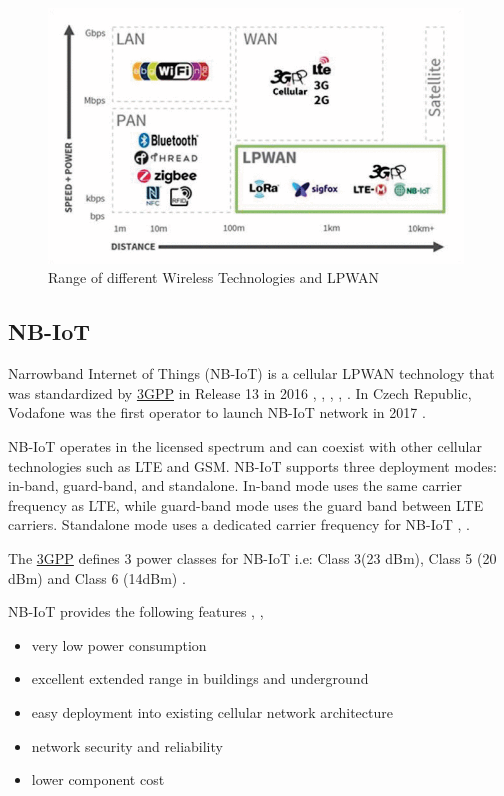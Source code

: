\begin{figure}[h!]
    \centering
    \includegraphics[width=0.98\textwidth]{pict/lpwan.png}
    \caption{Range of different Wireless Technologies and LPWAN \cite{LPWAN-overview}}
    \label{fig:lpwan-overview}
\end{figure}

\subsection{NB-IoT} 
Narrowband Internet of Things (NB-IoT) is a cellular LPWAN technology that was standardized by \href{https://www.3gpp.org/news-events/3gpp-news/nb-iot-complete}{3GPP} in Release 13 in 2016 \cite{ubox_nb-iot}, \cite{NB_IoT-rohde}, \cite{Rastogi2020NarrowbandStudy}, \cite{Wang2017AThings}, \cite{Kellerman}. In Czech Republic, Vodafone was the first
operator to launch NB-IoT network in 2017 \cite{vodafone-iot}. 

NB-IoT operates in the licensed spectrum and can coexist with other cellular technologies such as LTE and GSM. NB-IoT supports three deployment modes: in-band, guard-band, and standalone. In-band mode uses the same carrier frequency as LTE, while guard-band mode uses the guard band between LTE carriers. Standalone mode
uses a dedicated carrier frequency for NB-IoT \cite{NB_IoT-rohde}, \cite{ericsson-tech-review}. 

The \href{https://www.3gpp.org/news-events/3gpp-news/nb-iot-complete}{3GPP} defines 3 power classes for NB-IoT i.e: Class 3(23 dBm), Class 5 (20 dBm) and Class 6 (14dBm) \cite{NB_IoT-rohde}.

NB-IoT provides the following features \cite{ubox_nb-iot}, \cite{NB_IoT-rohde}, \cite{ericsson-tech-review}
\begin{itemize}
    \item very low power consumption
    \item excellent extended range in buildings and underground
    \item easy deployment into existing cellular network architecture
    \item network security and reliability
    \item lower component cost
\end{itemize}

